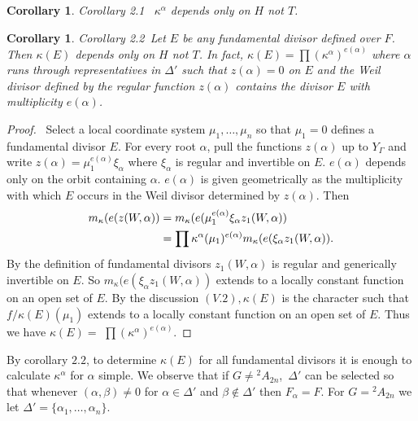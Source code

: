 \documentclass{memo-l}
\newtheorem{corollary}[theorem]{Corollary}
\theoremstyle{definition}
\theoremstyle{remark}
\numberwithin{section}{chapter}
\numberwithin{equation}{chapter}
\begin{document}
\medpagebreak

\begin{corollary}{Corollary 2.1 }\  ${\kappa}^{{\alpha}}$ depends only on $H$ not
$T$.
\end{corollary}

\begin{corollary}{Corollary 2.2}\ Let $E$ be {\it any} fundamental divisor defined
over $F$.  Then ${\kappa}(E)$ depends only on $H$ not $T$.  In fact,
${\kappa}(E)  =  \prod({\kappa}^\alpha)^{e(\alpha)}$ where ${\alpha}$
runs through representatives in ${\Delta}'$ such that $z({\alpha}) = 0$ on
$E$ and the Weil divisor defined by the regular function $z({\alpha})$
contains the divisor $E$ with multiplicity $e({\alpha})$.
\end{corollary}

\begin{proof} \ Select a local coordinate system ${\mu}_{1},\ldots ,{\mu}_{n}$
so that ${\mu}_{1} = 0$ defines a fundamental divisor $E$.  For every
root ${\alpha}$, pull the functions $z({\alpha})$ up to $Y_{{\Gamma}}$ and
write $z({\alpha})  =  {\mu}_{1}^{e({\alpha})}{\xi}_{{\alpha}}$ where
${\xi}_{{\alpha}}$ is regular and invertible on $E$.  $e({\alpha})$ depends
only on the orbit containing ${\alpha}$.  $e({\alpha})$ is given
geometrically as the multiplicity with which $E$ occurs in the Weil divisor
determined by $z({\alpha})$.  Then
$$
\aligned
m_{{\kappa}}(e(z(W,{\alpha}))  &=
m_{{\kappa}}(e({\mu}_{1}^{e({\alpha})}{\xi}_{{\alpha}}z_{1}(W,{\alpha})) \\
&= \prod{\kappa}^{{\alpha}}({\mu}_{1})^{e({\alpha})}m_{{\kappa}}(e({\xi}_{{\alpha}}z_{1}(W,{\alpha})).
\endaligned
$$
By the definition of fundamental divisors $z_{1}(W,{\alpha})$ is regular and
generically invertible on $E$.  So
$m_{{\kappa}}(e({\xi}_{{\alpha}}z_{1}(W,{\alpha}))$ extends to a locally
constant function on an open set of $E$.  By the discussion $(V.2),
{\kappa}(E)$ is the character such that $f/{\kappa}(E)({\mu}_{1})$ extends
to a locally constant function on an open set of $E$.  Thus we have
${\kappa}(E)  = $ $\prod({\kappa}^{{\alpha}})^{e({\alpha})}$.
\end{proof}

{\medskip}

   By corollary $2.2$, to determine ${\kappa}(E)$ for all fundamental divisors it
is enough to calculate ${\kappa}^{{\alpha}}$ for ${\alpha}$ simple.  We
observe that if $G \ne {{}^{2}A_{2n}}$,\  ${\Delta}'$ can be selected so that
whenever $({\alpha},{\beta}) \ne 0$ for ${\alpha}  \in  {\Delta}'$ and
${\beta} {\notin} {\Delta}'$ then $F_{{\alpha}} = F$.  For $G = {{}^{2}A_{2n}}$ we
let ${\Delta}' = \{{\alpha}_{1},\ldots ,{\alpha}_{n}\}$.
\end{document}
